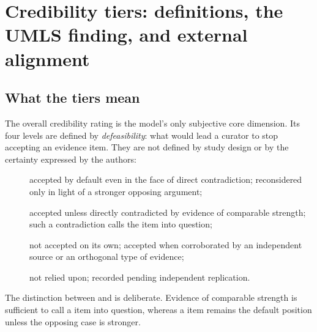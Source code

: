 \section{Credibility tiers: definitions, the UMLS finding, and external alignment}
\label{sec:supp-credibility}

\subsection{What the tiers mean}
\label{sec:supp-credibility-defs}

The overall credibility rating is the model's only subjective core
dimension. Its four levels are defined by \emph{defeasibility}: what
would lead a curator to stop accepting an evidence item. They are not
defined by study design or by the certainty expressed by the authors:

\begin{description}
  \item[] accepted by default even in the face of direct
    contradiction; reconsidered only in light of a stronger opposing
    argument;
  \item[] accepted unless directly contradicted by evidence of
    comparable strength; such a contradiction calls the item into question;
  \item[] not accepted on its own; accepted when corroborated
    by an independent source or an orthogonal type of evidence;
  \item[] not relied upon; recorded pending independent
    replication.
\end{description}

The distinction between  and  is
deliberate. Evidence of comparable strength is sufficient to call a
 item into question, whereas a  item
remains the default position unless the opposing case is stronger.

